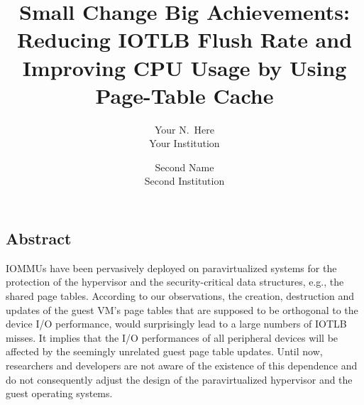 \documentclass[letterpaper,twocolumn,10pt]{article}
\begin{document}
\newcommand{\name}{IOSUP\xspace}
\newcommand{\eat}[1]{}  %
\newcommand{\authcomment}[3]{\textcolor{#3}{#1 says: #2}}\newcommand{\yueqiang}[1]{\authcomment{Yueqiang}{#1}{red}}
\newcommand{\zhi}[1]{\authcomment{Zhi}{#1}{red}}



\date{}

\title{\Large \bf Small Change Big Achievements: Reducing IOTLB Flush Rate and Improving CPU Usage by Using Page-Table Cache}

\author{
{\rm Your N.\ Here}\\
Your Institution
\and
{\rm Second Name}\\
Second Institution
} %

\maketitle

\thispagestyle{empty}


\subsection*{Abstract}

IOMMUs have been pervasively deployed on paravirtualized systems for the protection of the hypervisor and the security-critical data structures, e.g., the shared page tables. According to our observations, the creation, destruction and updates of the guest VM's page tables that are supposed to be orthogonal to the device I/O performance, would surprisingly lead to a large numbers of IOTLB misses. It implies that the I/O performances of all peripheral devices will be affected by the seemingly unrelated guest page table updates. Until now, researchers and developers are not aware of the existence of this dependence and do not consequently adjust the design of the paravirtualized hypervisor and the guest operating systems.
\end{document}
